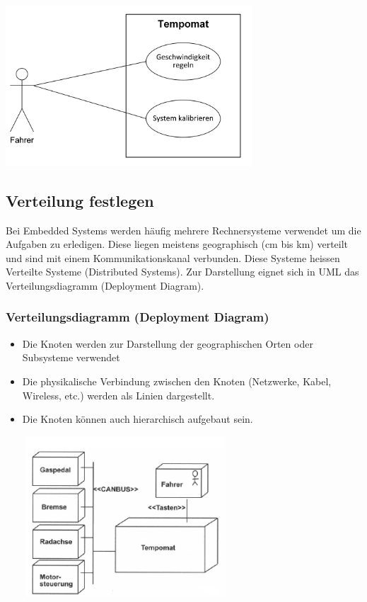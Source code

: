 \includegraphics[height=6cm]{images/Modellierung/Systemgrenze}

\subsection{Verteilung festlegen}
Bei Embedded Systems werden häufig mehrere Rechnersysteme verwendet um die Aufgaben zu erledigen. Diese liegen meistens 
geographisch (cm bis km) verteilt und sind mit einem Kommunikationskanal verbunden. Diese Systeme heissen Verteilte Systeme (Distributed Systems). Zur Darstellung eignet sich in UML das Verteilungsdiagramm (Deployment Diagram).

\subsubsection{Verteilungsdiagramm (Deployment Diagram)}
\begin{itemize}
	\item Die Knoten werden zur Darstellung der geographischen Orten oder Subsysteme verwendet
	\item Die physikalische Verbindung zwischen den Knoten (Netzwerke, Kabel, Wireless, etc.) werden als Linien dargestellt.
	\item Die Knoten können auch hierarchisch aufgebaut sein.
\end{itemize}

\includegraphics[height=6cm, width = 9cm,]{images/Modellierung/Verteilungsdiagramm}


